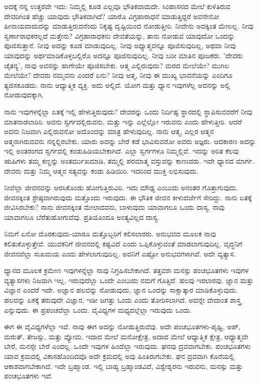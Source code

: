 ಅದಕ್ಕೆ ನನ್ನ ಉತ್ತರವೇ ಇದು: ನಿಮ್ಮಲ್ಲಿ ಕೂಡ ಎಲ್ಲವೂ ಭೌತಿಕವಾದುದೇ. ಸಿಂಹಾಸನದ ಮೇಲೆ ಕುಳಿತಿರುವ ದೇವರಿಗಿಂತ ಹೆಚ್ಚು ಯಾವುದು ಭೌತಿಕವಾಗಿದೆ? ಯಾರೊ ವಿಗ್ರಹಾರಾಧನೆ ಮಾಡುತ್ತಿದ್ದರೆ ಅವನೇನೋ ಹೀನಾಯವಾದುದನ್ನು ಮಾಡುತ್ತಿರುವನೆಂದು ನಿಕೃಷ್ಟ ದೃಷ್ಟಿಯಿಂದ ನೋಡುತ್ತೀರಿ. ನೀವೇನು ಅದಕ್ಕಿಂತ ಮೇಲಲ್ಲ. ನೀವು ಸ್ವರ್ಣಾರಾಧಕರಲ್ಲದೆ ಮತ್ತೇನು? ವಿಗ್ರಹಾರಾಧಕನು ದೇವತೆಯನ್ನು, ತಾನು ನೋಡುವ ಯಾವುದೋ ಒಂದನ್ನು ಪೂಜಿಸುತ್ತಾನೆ. ನೀವು ಅದನ್ನು ಕೂಡ ಮಾಡುವುದಿಲ್ಲ. ನೀವು ಅಧ್ಯಾತ್ಮವನ್ನೂ ಪೂಜಿಸುವುದಿಲ್ಲ, ಅಥವಾ ನೀವು ಯಾವುದನ್ನು ಅರ್ಥಮಾಡಿಕೊಳ್ಳಬಲ್ಲಿರೊ ಅದನ್ನೂ ಪೂಜಿಸುವುದಿಲ್ಲ. ನೀವು ಬರೀ ಮಾತಿನ ಪೂಜಕರು. 'ದೇವರು ಚೈತನ್ಯ', ನಾವು ಅವನನ್ನು ಹಾಗೇಯೇ ಪೂಜಿಸಬೇಕು. ಆತ್ಮ ಎಲ್ಲಿರುವುದು? ಮರದ ಮೇಲೆಯೇ? ಮುಗಿಲ ಮೇಲೆಯೇ? ದೇವರು ನಮ್ಮವನು ಎಂದರೆ ಏನು? ನೀವು ಆತ್ಮ, ನೀವು ಈ ಮುಖ್ಯ ಭಾವನೆಯನ್ನು ಎಂದಿಗೂ ತ್ಯಜಿಸಕೂಡದು. ನಾನು ಆಧ್ಯಾತ್ಮಿಕ ವ್ಯಕ್ತಿ. ಅದು ಅಲ್ಲಿದೆ. ಯೋಗ ಮತ್ತು ಧ್ಯಾನ ಇವುಗಳೆಲ್ಲ ಅವನನ್ನು ಅಲ್ಲಿ ನೋಡುವುದಕ್ಕಾಗಿ.

ನಾನು ಇವುಗಳನ್ನೆಲ್ಲಾ ಏತಕ್ಕೆ ಇಲ್ಲಿ ಹೇಳುತ್ತಿರುವುದು? ದೇವರನ್ನು ಒಂದು ನಿರ್ದಿಷ್ಟ ಸ್ಥಾನದಲ್ಲಿ ಸ್ಥಾಪಿಸುವವರೆಗೆ ನೀವು ಮಾತನಾಡಲಾರಿರಿ. ಅವನು ಸ್ವರ್ಗದಲ್ಲಿರುವನು, ಮತ್ತು ಇನ್ನು ಎಲ್ಲೆಲ್ಲೋ ಇರುವನು ಎಂದು ಹೇಳುತ್ತೀರಿ. ಆದರೆ ಅವನು ನಿಜವಾಗಿ ಎಲ್ಲಿರುವನೋ ಅದೊಂದನ್ನು ಮಾತ್ರ ಹೇಳುವುದಿಲ್ಲ. ನಾನು ಆತ್ಮ, ಎಲ್ಲರ ಆತ್ಮನ ಆತ್ಮನಾಗಿರುವವನು ನನ್ನಲ್ಲಿರಬೇಕು. ಯಾರು ಅದನ್ನು ಬೇರೆ ಕಡೆ ಭಾವಿಸುವರೋ ಅವರು ಅಜ್ಞರು. ಆದಕಾರಣ ಅದನ್ನು ಇಲ್ಲಿ ಅಂತರಂಗದ ಸ್ವರ್ಗದಲ್ಲಿ ಕಂಡುಹಿಡಿಯಬೇಕಾಗಿದೆ. ಎಲ್ಲಾ ಸ್ವರ್ಗಗಳೂ ನಿಮ್ಮಲ್ಲಿವೆ. ಇದನ್ನು ಅರಿತ ಕೆಲವು ಋಷಿಗಳು ತಮ್ಮ ಕಣ್ಣನ್ನು ಅಂತರ್ಮುಖಮಾಡಿ, ತಮ್ಮಲ್ಲಿ ಪರಮಾತ್ಮ ವಸ್ತುವನ್ನು ಕಾಣುವರು. ಇದೇ ಧ್ಯಾನದ ಮಾರ್ಗ. ದೇವರು ಮತ್ತು ನಿಮ್ಮ ಆತ್ಮನ ಸತ್ಯವನ್ನು ಕಂಡು ಹಿಡಿಯಿರಿ. ಇದರಿಂದ ಮುಕ್ತಿ ಲಭಿಸುವುದು.

ನೀವೆಲ್ಲಾ ಜೀವನವನ್ನು ಅರಸಿಕೊಂಡು ಹೋಗುತ್ತಿರುವಿರಿ. ಇದು ಮೌಢ್ಯ ಎಂಬುದು ಅನಂತರ ಗೊತ್ತಾಗುವುದು. ಜೀವನಕ್ಕಿಂತ ಶ್ರೇಷ್ಠವಾಗಿರುವುದು ಮತ್ತೊಂದು ಇರುವುದು. ಈ ಭೌತಿಕ ಜೀವನ ಕೀಳುದರ್ಜೆಗೆ ಸೇರಿದ್ದು. ನಾನು ಏತಕ್ಕೆ ಜೀವಿಸಿರಬೇಕು? ನಾನು ಜೀವನಕ್ಕಿಂತ ಮೇಲಾದವನು, ಬಾಳುವುದು ಯಾವಾಗಲೂ ಒಂದು ದಾಸ್ಯ, ನಾವು ಯಾವಾಗಲೂ ಬೆರೆತುಹೋಗುವೆವು. ಪ್ರತಿಯೊಂದೂ ಅಂತ್ಯವಿಲ್ಲದ ದಾಸ್ಯ.

ನಿಮಗೆ ಏನೋ ದೊರಕುವುದು-ಯಾರೂ ಮತ್ತೊಬ್ಬರಿಗೆ ಕಲಿಸಲಾರರು. ಅನುಭವದ ಮೂಲಕ ನಾವು ಕಲಿತುಕೊಳ್ಳುತ್ತೇವೆ. ಯುವಕನಿಗೆ ಜೀವನದಲ್ಲಿ ಕಷ್ಟವಿದೆ ಎಂದು ಒಪ್ಪಿಕೊಳ್ಳುವಂತೆ ಮಾಡಲಾಗುವುದಿಲ್ಲ. ವೃದ್ಧನಿಗೆ ಜೀವನವೆಲ್ಲಾ ಸುಖಮಯ ಎಂದು ಹೇಳಲಾಗುವುದಿಲ್ಲ. ಅವನಿಗೆ ಎಷ್ಟೋ ಅನುಭವಗಳಾಗಿವೆ. ಅದೇ ವ್ಯತ್ಯಾಸ.

ಧ್ಯಾನದ ಮೂಲಕ ಕ್ರಮೇಣ ಇವುಗಳನ್ನೆಲ್ಲಾ ನಾವು ನಿಗ್ರಹಿಸಬೇಕಾಗಿದೆ. ತತ್ತವಶಃ ಮನಸ್ಸು ಪಂಚಭೂತಗಳು ಇವುಗಳ ವ್ಯತ್ಯಾಸಗಳು ನಿಜವಾಗಿ ಇಲ್ಲ. ಇರುವುದೆಲ್ಲಾ ಒಂದೇ ಎಂಬುದು ನಮಗೆ ಗೊತ್ತಿದೆ. ಹಲವು ಇರಲಾರವು. ಜ್ಞಾನ ಮತ್ತು ವಿಜ್ಞಾನ ಎಂದರೆ ಇದೇ. ಅಜ್ಞಾನ ಹಲವನ್ನು ನೋಡುವುದು, ಜ್ಞಾನ ಒಂದನ್ನು ಸಾಕ್ಷಾತ್ಕಾರ ಮಾಡಿಕೊಳ್ಳುವುದು. ಹಲವನ್ನು ಏಕಕ್ಕೆ ತರುವುದೇ ವಿಜ್ಞಾನ, ಇಡೀ ಜಗತ್ತು ಒಂದು ಎಂದು ತೋರಿಸಲಾಗಿದೆ. ಅದನ್ನೇ ವೇದಾಂತ ಶಾಸ್ತ್ರ ಎನ್ನುವುದು. ಈ ಪ್ರಪಂಚವೆಲ್ಲಾ ಒಂದು. ವೈವಿಧ್ಯಗಳ ಮಧ್ಯದಲ್ಲೆಲ್ಲಾ ಇರುವುದು ಒಂದು.

ಈಗ ಈ ವೈವಿಧ್ಯಗಳೆಲ್ಲಾ ಇವೆ. ನಾವು ಈಗ ಅದನ್ನು ನೋಡುತ್ತಿರುವೆವು. ಅದೇ ಪಂಚಭೂತಗಳು-ಪೃಥ್ವಿ, ಅಪ್, ಮರುತ್, ತೇಜಸ್ಸು, ಮತ್ತು ವ್ಯೋಮ. ಇದಾದ ಮೇಲೆ ಮನೋಕ್ಷೇತ್ರ, ಅದಾದ ಮೇಲೆ ಆಧ್ಯಾತ್ಮಿಕ ಕ್ಷೇತ್ರ, ಆಧ್ಯಾತ್ಮವೇ ಬೇರೆ, ಮನಸ್ಸೇ ಬೇರೆ ಎಂದಲ್ಲ. ಒಂದೇ ಇವುಗಳ ಹಿಂದೆಲ್ಲಾ ಇರುವುದು. ಘನವು ದ್ರವವಾಗಬೇಕು. ಪಂಚಭೂತಗಳು ಯಾವ ಕ್ರಮದಲ್ಲಿ ವಿಕಾಸಹೊಂದಿದವೊ ಅದೇ ಕ್ರಮದಲ್ಲಿ ಅವು ಹಿಂತಿರುಗಬೇಕು. ಘನ ದ್ರವವಾಗಿ ಕೊನೆಯಲ್ಲಿ ಆಕಾಶವಾಗಬೇಕಾಗಿದೆ. ಇದೇ ಬ್ರಹ್ಮಾಂಡ. ಇಲ್ಲಿ ಬಾಹ್ಯ ಬ್ರಹ್ಮಾಂಡವಿದೆ, ವಿಶ್ವೇಶ್ವರನು ಇರುವನು, ಮನಸ್ಸು ಮತ್ತು ಪಂಚಭೂತಗಳು ಇವೆ.

